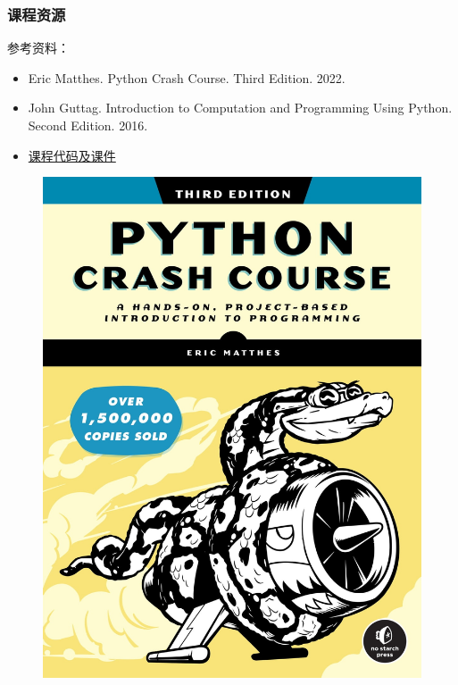 \documentclass[aspectratio=169, 14pt]{beamer}
\begin{document}
\begin{frame}
	\frametitle{课程资源}
	参考资料：
	\begin{itemize}
		\item Eric Matthes. \alert{Python Crash Course}. Third Edition. 2022.
		\item John Guttag. \alert{Introduction to Computation and Programming Using Python}. Second Edition. 2016.
		\item \href{https://github.com/ChenZhongPu/python-swufe}{课程代码及课件}
	\end{itemize}

	\begin{figure}
		\includegraphics[height=.35\paperheight]{week1/python-crash-course-3rd-edition.jpg}
	\end{figure}

\end{frame}
\end{document}
